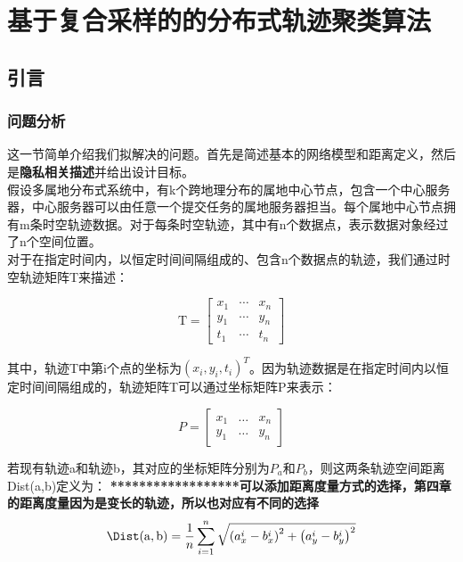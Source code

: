 \chapter{基于复合采样的的分布式轨迹聚类算法}
\section{引言}


\subsection{问题分析}
这一节简单介绍我们拟解决的问题。首先是简述基本的网络模型和距离定义，然后是\textbf{隐私相关描述}并给出设计目标。\\
假设多属地分布式系统中，有k个跨地理分布的属地中心节点，包含一个中心服务器，中心服务器可以由任意一个提交任务的属地服务器担当。每个属地中心节点拥有m条时空轨迹数据。对于每条时空轨迹，其中有n个数据点，表示数据对象经过了n个空间位置。\\
对于在指定时间内，以恒定时间间隔组成的、包含n个数据点的轨迹，我们通过时空轨迹矩阵T来描述：

\[
\mathrm{T}=\left[\begin{array}{lll}
{x_{1}} & {\cdots} & {x_{n}} \\
{y_{1}} & {\cdots} & {y_{n}} \\
{t_{1}} & {\cdots} & {t_{n}}
\end{array}\right]
\]

其中，轨迹T中第i个点的坐标为$(x_i,y_i,t_i)^T$。因为轨迹数据是在指定时间内以恒定时间间隔组成的，轨迹矩阵T可以通过坐标矩阵P来表示：

\[
P=\left[\begin{array}{lll}
{x_{1}} & {\dots} & {x_{n}} \\
{y_{1}} & {\dots} & {y_{n}}
\end{array}\right]
\]

若现有轨迹a和轨迹b，其对应的坐标矩阵分别为$P_a$和$P_b$，则这两条轨迹空间距离Dist(a,b)定义为：
\textbf{******************可以添加距离度量方式的选择，第四章的距离度量因为是变长的轨迹，所以也对应有不同的选择}\\

\begin{equation}
\label{ch3dist}
\Dist(\mathrm{a}, \mathrm{b})=\frac{1}{n} \sum_{i=1}^{n} \sqrt{\left(a_{x}^{i}-b_{x}^{i}\right)^{2}+\left(a_{y}^{i}-b_{y}^{i}\right)^{2}}
\end{equation}

